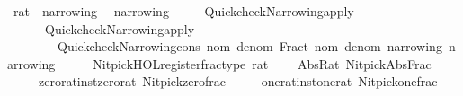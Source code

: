 \begin{isabellebody}
\ rat\ {\isacharcolon}{\kern0pt}{\isacharcolon}{\kern0pt}\ narrowing\isanewline
{}\isanewline
\isanewline
{}\isamarkupfalse%
\isanewline
\ \ {\isachardoublequoteopen}narrowing\ {\isacharequal}{\kern0pt}\isanewline
\ \ \ \ Quickcheck{\isacharunderscore}{\kern0pt}Narrowing{\isachardot}{\kern0pt}apply\isanewline
\ \ \ \ \ \ {\isacharparenleft}{\kern0pt}Quickcheck{\isacharunderscore}{\kern0pt}Narrowing{\isachardot}{\kern0pt}apply\isanewline
\ \ \ \ \ \ \ \ {\isacharparenleft}{\kern0pt}Quickcheck{\isacharunderscore}{\kern0pt}Narrowing{\isachardot}{\kern0pt}cons\ {\isacharparenleft}{\kern0pt}{\isasymlambda}nom\ denom{\isachardot}{\kern0pt}\ Fract\ nom\ denom{\isacharparenright}{\kern0pt}{\isacharparenright}{\kern0pt}\ narrowing{\isacharparenright}{\kern0pt}\ narrowing{\isachardoublequoteclose}\isanewline
\isanewline
{}\isamarkupfalse%
%
\isadelimproof
\ %
\endisadelimproof
%
\isatagproof
\isacommand{{\isachardot}{\kern0pt}{\isachardot}{\kern0pt}}\isamarkupfalse%
%
\endisatagproof
{\isafoldproof}%
%
\isadelimproof
%
\endisadelimproof
\isanewline
\isanewline
{}\isamarkupfalse%
%
\isadelimdocument
%
\endisadelimdocument
%
\isatagdocument
%
\isamarkuptrue%
%
\endisatagdocument
{\isafolddocument}%
%
\isadelimdocument
%
\endisadelimdocument
%
\isadelimML
%
\endisadelimML
%
\isatagML
{}\isamarkupfalse%
\ {\isacartoucheopen}\isanewline
\ \ Nitpick{\isacharunderscore}{\kern0pt}HOL{\isachardot}{\kern0pt}register{\isacharunderscore}{\kern0pt}frac{\isacharunderscore}{\kern0pt}type\ \isactrltypeUNDERSCOREname {\isasymopen}rat{\isasymclose}\isanewline
\ \ \ \ {\isacharbrackleft}{\kern0pt}{\isacharparenleft}{\kern0pt}\isactrlconstUNDERSCOREname {\isasymopen}Abs{\isacharunderscore}{\kern0pt}Rat{\isasymclose}{\isacharcomma}{\kern0pt}\ \isactrlconstUNDERSCOREname {\isasymopen}Nitpick{\isachardot}{\kern0pt}Abs{\isacharunderscore}{\kern0pt}Frac{\isasymclose}{\isacharparenright}{\kern0pt}{\isacharcomma}{\kern0pt}\isanewline
\ \ \ \ \ {\isacharparenleft}{\kern0pt}\isactrlconstUNDERSCOREname {\isasymopen}zero{\isacharunderscore}{\kern0pt}rat{\isacharunderscore}{\kern0pt}inst{\isachardot}{\kern0pt}zero{\isacharunderscore}{\kern0pt}rat{\isasymclose}{\isacharcomma}{\kern0pt}\ \isactrlconstUNDERSCOREname {\isasymopen}Nitpick{\isachardot}{\kern0pt}zero{\isacharunderscore}{\kern0pt}frac{\isasymclose}{\isacharparenright}{\kern0pt}{\isacharcomma}{\kern0pt}\isanewline
\ \ \ \ \ {\isacharparenleft}{\kern0pt}\isactrlconstUNDERSCOREname {\isasymopen}one{\isacharunderscore}{\kern0pt}rat{\isacharunderscore}{\kern0pt}inst{\isachardot}{\kern0pt}one{\isacharunderscore}{\kern0pt}rat{\isasymclose}{\isacharcomma}{\kern0pt}\ \isactrlconstUNDERSCOREname {\isasymopen}Nitpick{\isachardot}{\kern0pt}one{\isacharunderscore}{\kern0pt}frac{\isasymclose}{\isacharparenright}{\kern0pt}{\isacharcomma}{\kern0pt}\isanewline

\end{isabellebody}
